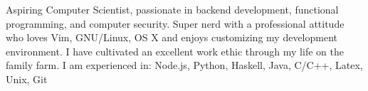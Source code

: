 

\begin{cvparagraph}

Aspiring Computer Scientist, passionate in backend development, functional programming, 
and computer security. Super nerd with a professional attitude who loves Vim, GNU/Linux, OS X and enjoys customizing 
my development environment. 
I have cultivated an excellent work ethic through my life on the family farm.
I am experienced in: Node.js, Python, Haskell, Java, C/C++, Latex, Unix, Git
\end{cvparagraph}
